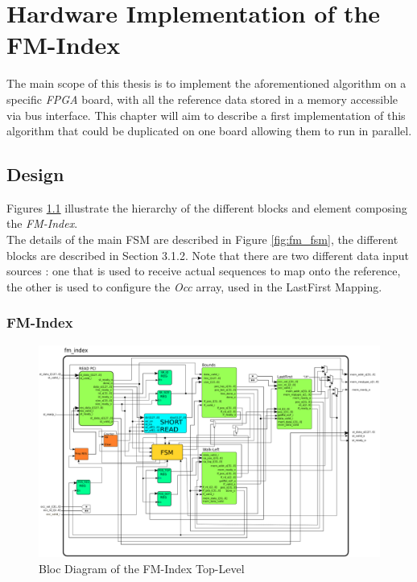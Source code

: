 
\chapter{Hardware Implementation of the FM-Index} %

\label{Chapter3} %
The main scope of this thesis is to implement the aforementioned algorithm on a specific \textsl{FPGA} board, with all the reference data stored in a memory accessible via bus interface. This chapter will aim to describe a first implementation of this algorithm that could be duplicated on one board allowing them to run in parallel.

\section{Design}



Figures \ref{fig:seqschema} illustrate the hierarchy of the different blocks and element composing the \textsl{FM-Index}. \\

The details of the main FSM are described in Figure \ref{fig:fm_fsm}, the different blocks are described in Section 3.1.2. Note that there are two different data input sources : one that is used to receive actual sequences to map onto the reference, the other is used to configure the \textsl{Occ} array, used in the LastFirst Mapping.

\subsection{FM-Index}

\begin{figure}[H]
    \centering
    \hspace*{-20mm}\includegraphics[scale = 0.45]{Figures/fmindex_top.png}
    \caption{Bloc Diagram of the FM-Index Top-Level}
    \label{fig:seqschema}
\end{figure}

